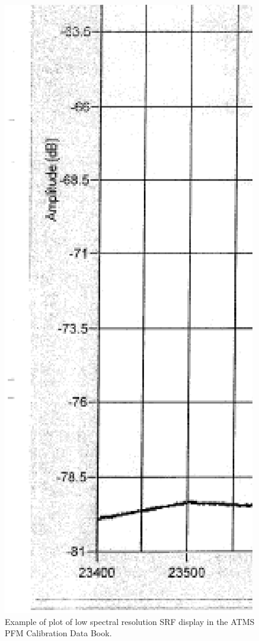 \begin{figure}[H]
  \centering
  \includegraphics[bb=368 260 1540 1062,scale=0.25]{graphics/srf/Rset/ch1.RESlow.eps}
  \caption{Example of plot of low spectral resolution SRF display in the ATMS PFM Calibration Data Book\cite{ATMS_PFM_CalLog}.}
  \label{fig:ch1.RESlow}
\end{figure}

